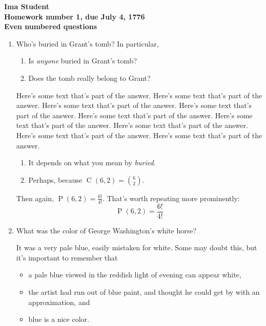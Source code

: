 \documentclass[12pt]{amsart}
\DeclareMathOperator{\perm}{P}
\DeclareMathOperator{\comb}{C}
\begin{document}
\begin{center}
  \bfseries
  Ima Student\\
  Homework number 1, due July 4, 1776\\
  Even numbered questions
\end{center}

\bigskip

\begin{enumerate}
\item Who's buried in Grant's tomb?  In particular,
  \begin{enumerate}
  \item Is \emph{anyone} buried in Grant's tomb?
  \item Does the tomb really belong to Grant?
  \end{enumerate}

  Here's some text that's part of the answer. Here's some text that's
  part of the answer. Here's some text that's part of the
  answer. Here's some text that's part of the answer. Here's some text
  that's part of the answer. Here's some text that's part of the
  answer. Here's some text that's part of the answer. Here's some text
  that's part of the answer. Here's some text that's part of the
  answer.
  \begin{enumerate}
  \item It depends on what you mean by \emph{buried}.
  \item Perhaps, because $\comb(6,2) = \binom{6}{2}$.
  \end{enumerate}
  Then again, $\perm(6,2) = \frac{6!}{4!}$.  That's worth repeating
  more prominently:
  \begin{displaymath}
    \perm(6,2) = \frac{6!}{4!}
  \end{displaymath}

\item What was the color of George Washington's white horse?

  It was a very pale blue, easily mistaken for white.  Some may doubt
  this, but it's important to remember that
  \begin{itemize}
  \item a pale blue viewed in the reddish light of evening can appear
    white,
  \item the artist had run out of blue paint, and thought he could get
    by with an approximation, and
  \item blue is a nice color.
  \end{itemize}


\end{enumerate}
\end{document}
